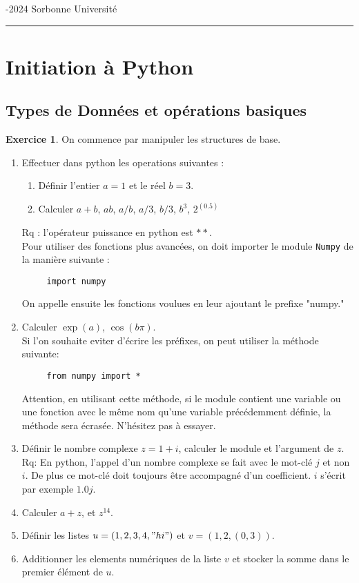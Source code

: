 \documentclass[a4paper,francais,11pt]{article}
\theoremstyle{definition}
\newtheorem{exercice}{Exercice}
\begin{document}
\noindent
{\large{}-2024
\hfill
Sorbonne Université}
\bigskip
\hrule
\bigskip

\section{ Initiation à Python}
\subsection{Types de Données et opérations basiques}
\begin{exercice}
On commence par manipuler les structures de base.
  \begin{enumerate}
  \item  Effectuer dans python les operations suivantes :
    \begin{enumerate}
    \item Définir l'entier $a=1$ et le réel $b=3.$
    \item Calculer $a+b$, $ab$, $a/b$, $a/3$, $b/3$, $b^3$, $2^{(0.5)}$
    \end{enumerate}
Rq : l'opérateur puissance en python est $**$.\\
    Pour utiliser des fonctions plus avancées, on doit importer le module \verb|Numpy| de la manière suivante :
    \begin{verbatim}
     import numpy 
     \end{verbatim}
     On appelle ensuite les fonctions voulues en leur ajoutant le prefixe "numpy."
  \item Calculer $\exp(a)$, $\cos(b\pi)$.\\

    Si l'on souhaite eviter d'écrire les préfixes, on peut utiliser la méthode suivante:
    \begin{verbatim}
     from numpy import *
     \end{verbatim}
    Attention, en utilisant cette méthode, si le module contient une variable ou une fonction avec le même nom qu'une variable précédemment définie, la méthode sera écrasée. N'hésitez pas à essayer.

    \item Définir le nombre complexe $z=1+i$, calculer le module et l'argument de $z$. 
Rq: En python, l'appel d'un nombre complexe se fait avec le mot-clé $j$ et non $i$. De plus ce mot-clé doit toujours être accompagné d'un coefficient. $i$ s'écrit par exemple $1.0j$.
    \item Calculer $a+z$, et $z^{14}$.
    \item Définir les listes $u=(1,2,3,4,"hi")$ et $v=(1,2,(0,3))$.
    \item Additionner les elements numériques de la liste $v$ et stocker la somme dans le premier élément de $u$.\\


\end{enumerate}
\end{exercice}
\end{document}
